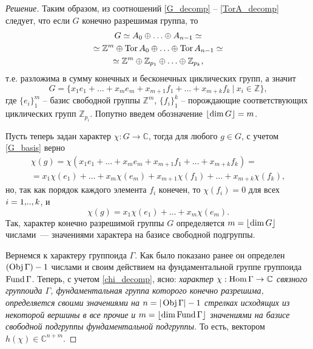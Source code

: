 \begin{proof}[Решение]
    Таким образом, из соотношений \eqref{G_decomp} -- \eqref{TorA_decomp} 
    следует, что если $G$ конечно разрешимая группа, то
    \begin{gather*}
        G \simeq A_0 \oplus \ldots \oplus A_{n-1} \simeq \\ 
        \simeq \mathbb{Z}^m \oplus \operatorname*{Tor} A_0 \oplus \ldots \oplus \operatorname*{Tor} A_{n-1} \simeq \\
        \simeq \mathbb{Z}^m \oplus \mathbb{Z}_{p_1} \oplus \ldots \oplus \mathbb{Z}_{p_k},
    \end{gather*}
    т.е. разложима в сумму конечных и бесконечных циклических групп, а значит
    \begin{equation}\label{G_basis}
        G = 
        \{x_1 e_1 + \ldots + x_m e_m + x_{m+1} f_1 + \ldots + x_{m+k} f_k 
        \:|\: x_i \in \mathbb{Z}\},
    \end{equation}
    где $\{e_i\}_1^m$ -- базис свободной группы $\mathbb{Z}^m$, $\{f_i\}_1^k$ -- 
    порождающие соответствующих циклических групп $\mathbb{Z}_{p_i}$. Попутно 
    введем обозначение $\lfloor \dim G \rfloor = m$.

    Пусть теперь задан характер $\chi: G \to \mathbb{C}$, тогда для любого 
    $g \in G$, с учетом \eqref{G_basis} верно
    \begin{multline*}
        \chi(g) = \chi(x_1 e_1 + \ldots + x_m e_m 
        + x_{m+1} f_1 + \ldots + x_{m+k} f_k ) = \\
        = x_1 \chi(e_1) + \ldots + x_m \chi(e_m) 
        + x_{m+1} \chi(f_1) + \ldots + x_{m+k} \chi(f_k),
    \end{multline*}
    но, так как порядок каждого элемента $f_i$ конечен, то $\chi(f_i) = 0$ для 
    всех $i=1 ,\!.., k$, и
    \begin{equation}\label{chi_decomp}
        \chi(g) = x_1 \chi(e_1) + \ldots + x_m \chi(e_m).
    \end{equation}
    Так, характер конечно разрешимой группы $G$ определяется $m = \lfloor \dim G \rfloor$ числами~--- 
    значениями характера на базисе свободной подгруппы.

    \bigskip

    Вернемся к характеру группоида $\Gamma$. Как было показано ранее он 
    определен $(\operatorname*{Obj} \Gamma) - 1$ числами и своим действием на фундаментальной 
    группе группоида $\operatorname*{Fund} \Gamma$. Теперь, с учетом \eqref{chi_decomp}, ясно:
    \emph{характер $\chi :\operatorname*{Hom} \Gamma \to \mathbb{C}$ связного группоида 
    $\Gamma$, фундаментальная группа которого конечно разрешима, определяется 
    своими значениями на $n = |\operatorname*{Obj} \Gamma| - 1$ стрелках исходящих из некоторой 
    вершины в все прочие и $m = \lfloor \dim \operatorname*{Fund} \Gamma \rfloor$ значениями на базисе 
    свободной подгруппы фундаментальной подгруппы.} То есть, вектором 
    $h(\chi) \in \mathbb{C}^{n+m}$.


\end{proof}
